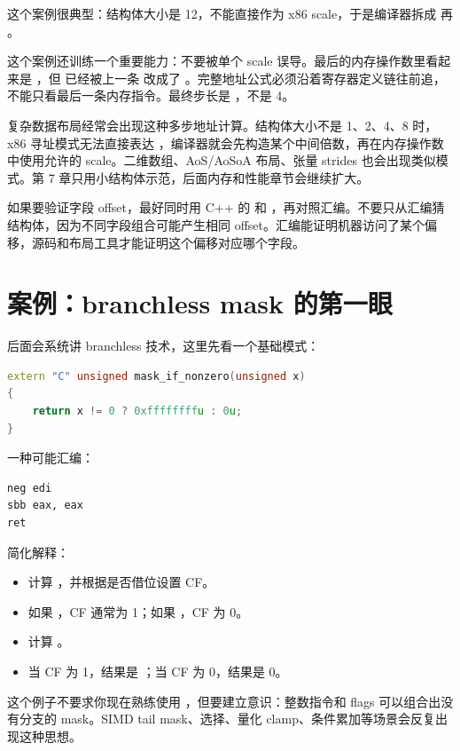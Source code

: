 这个案例很典型：结构体大小是 12，不能直接作为 x86 scale，于是编译器拆成  再 。

这个案例还训练一个重要能力：不要被单个 scale 误导。最后的内存操作数里看起来是 ，但  已经被上一条  改成了 。完整地址公式必须沿着寄存器定义链往前追，不能只看最后一条内存指令。最终步长是 ，不是 4。

复杂数据布局经常会出现这种多步地址计算。结构体大小不是 1、2、4、8 时，x86 寻址模式无法直接表达 ，编译器就会先构造某个中间倍数，再在内存操作数中使用允许的 scale。二维数组、AoS/AoSoA 布局、张量 strides 也会出现类似模式。第 7 章只用小结构体示范，后面内存和性能章节会继续扩大。

如果要验证字段 offset，最好同时用 C++ 的  和 ，再对照汇编。不要只从汇编猜结构体，因为不同字段组合可能产生相同 offset。汇编能证明机器访问了某个偏移，源码和布局工具才能证明这个偏移对应哪个字段。

\section{案例：branchless mask 的第一眼}

后面会系统讲 branchless 技术，这里先看一个基础模式：

\begin{lstlisting}[language=C++]
extern "C" unsigned mask_if_nonzero(unsigned x)
{
    return x != 0 ? 0xffffffffu : 0u;
}
\end{lstlisting}

一种可能汇编：

\begin{lstlisting}
neg edi
sbb eax, eax
ret
\end{lstlisting}

简化解释：

\begin{itemize}
  \item {} 计算 ，并根据是否借位设置 CF。
  \item 如果 ，CF 通常为 1；如果 ，CF 为 0。
  \item {} 计算 。
  \item 当 CF 为 1，结果是 ；当 CF 为 0，结果是 0。
\end{itemize}

这个例子不要求你现在熟练使用 ，但要建立意识：整数指令和 flags 可以组合出没有分支的 mask。SIMD tail mask、选择、量化 clamp、条件累加等场景会反复出现这种思想。

